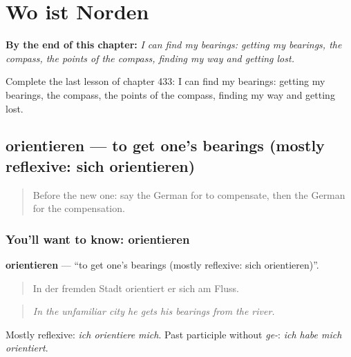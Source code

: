 
\chapter{Wo ist Norden}
\label{ch:ge-wo-ist-norden}

\begin{chapteropening}
\textbf{By the end of this chapter:} \emph{I can find my bearings: getting my bearings, the compass, the points of the compass, finding my way and getting lost.}

Complete the last lesson of chapter 433: I can find my bearings: getting my bearings, the compass, the points of the compass, finding my way and getting lost.
\end{chapteropening}

\section[orientieren]{orientieren — to get one's bearings (mostly reflexive: sich orientieren)}

\label{lesson:GE-C433-orientieren}



\begin{quote}
Before the new one: say the German for to compensate, then the German for the compensation.
\end{quote}

\subsection*{You'll want to know: orientieren}
\textbf{orientieren} — \textquotedblleft{}to get one's bearings (mostly reflexive: sich orientieren)\textquotedblright{}.

\begin{quote}
In der fremden Stadt orientiert er sich am Fluss.
\end{quote}

\begin{quote}
\emph{In the unfamiliar city he gets his bearings from the river.}
\end{quote}

Mostly reflexive: \emph{ich orientiere mich}. Past participle without \emph{ge-}: \emph{ich habe mich orientiert}.

